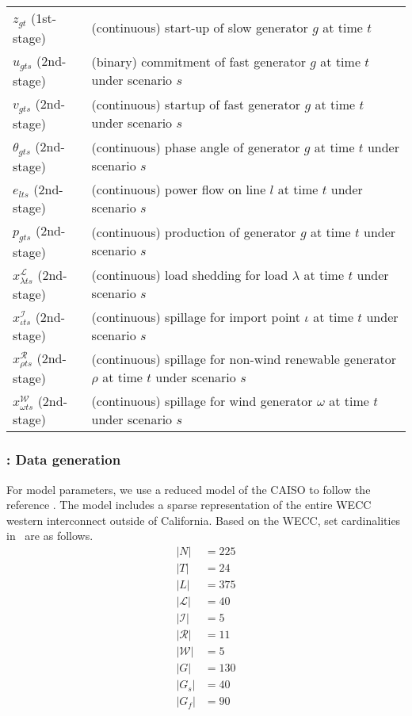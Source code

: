 \begin{table}[H]
{\begin{tabular}{ll}
			$z_{gt}$ (1st-stage)	&	(continuous) start-up of slow generator $g$ at time $t$\\
			$u_{gts}$ (2nd-stage)	&	(binary) commitment of fast generator $g$ at time $t$ under scenario $s$\\
			$v_{gts}$ (2nd-stage)	&	(continuous) startup of fast generator $g$ at time $t$ under scenario $s$\\
			$\theta_{gts}$ (2nd-stage)	&	(continuous) phase angle of generator $g$ at time $t$ under scenario $s$\\
			$e_{lts}$ (2nd-stage)	&	(continuous) power flow on line $l$ at time $t$ under scenario $s$\\
			$p_{gts}$ (2nd-stage)	&	(continuous) production of generator $g$ at time $t$ under scenario $s$\\
			$x_{\lambda ts}^\mathcal{L}$	(2nd-stage) & (continuous) load shedding for load $\lambda$ at time $t$ under scenario $s$	\\
			$x_{\iota ts}^\mathcal{I}$	(2nd-stage) &	(continuous) spillage for import point $\iota$ at time $t$ under scenario $s$\\
			$x_{\rho ts}^\mathcal{R}$ (2nd-stage)	& (continuous) spillage for non-wind renewable generator $\rho$ at time $t$ under scenario $s$  	\\
			$x_{\omega ts}^\mathcal{W}$ (2nd-stage)	& (continuous) spillage for wind generator $\omega$ at time $t$ under scenario $s$ 	\\
			\hline
		\end{tabular}
	}
\end{table}

\subsubsection{\suc: Data generation}
For model parameters, we use a reduced model of the CAISO to follow the reference \cite{AF2004}. The model includes a sparse representation of the entire WECC western interconnect outside of California. 
Based on the WECC, set cardinalities in \suc\ are as follows.
\begin{align*}
|N|&=225 \\
|T|&=24 \\
|L|&=375 \\
|\mathcal{L}|&=40\\
|\mathcal{I}|&=5\\
|\mathcal{R}|&=11\\
|\mathcal{W}|&=5\\
|G|&=130\\
|G_s|&=40\\
|G_f|&=90
\end{align*}

